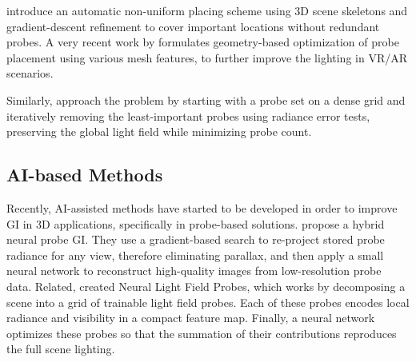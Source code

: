 \cite{Wang2019} introduce an automatic non-uniform placing scheme using 3D scene skeletons and gradient-descent refinement to cover important locations without redundant probes. A very recent work by \cite{Teuber2024} formulates geometry-based optimization of probe placement using various mesh features, to further improve the lighting in VR/AR scenarios.

Similarly, \cite{Vardis2021} approach the problem by starting with a probe set on a dense grid and iteratively removing the least-important probes using radiance error tests, preserving the global light field while minimizing probe count.

\subsection*{AI-based Methods}
Recently, AI-assisted methods have started to be developed in order to improve GI in 3D applications, specifically in probe-based solutions. \cite{Guo2022} propose a hybrid neural probe GI. They use a gradient-based search to re-project stored probe radiance for any view, therefore eliminating parallax, and then apply a small neural network to reconstruct high-quality images from low-resolution probe data. Related, \cite{You2024} created Neural Light Field Probes, which works by decomposing a scene into a grid of trainable light field probes. Each of these probes encodes local radiance and visibility in a compact feature map. Finally, a neural network optimizes these probes so that the summation of their contributions reproduces the full scene lighting. 

